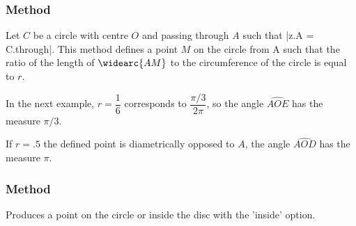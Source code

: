 \vspace{1em}
\begin{tkzexample}[latex=.5\textwidth]
\begin{center}
  \end{center}
\end{tkzexample}

\subsubsection{Method } %
\label{ssub:method_circle_point}

Let $C$ be a circle with centre $O$ and passing through $A$ such that |z.A = C.through|. This method defines a point $M$ on the circle from A such that the ratio of the length of $\widearc{AM}$ to the circumference of the circle is equal to $r$.

In the next example, $r=\dfrac{1}{6}$ corresponds to $\dfrac{\pi/3}{2\pi}$, so the angle $\widehat{AOE}$ has the measure $\pi/3$.

If $r=.5$ the defined point is diametrically opposed to $A$, the angle $\widehat{AOD}$ has the measure $\pi$.

\vspace{1em}
\begin{tkzexample}[latex=.5\textwidth]
\begin{center}
\end{center}
\end{tkzexample}


\subsubsection{Method } %
\label{ssub:method_imeth_circle_random_inside}
Produces a point on the circle or inside the disc with the 'inside' option.

